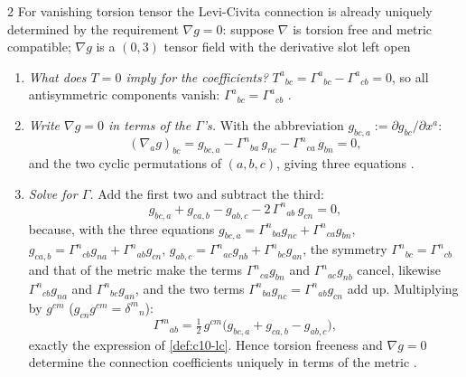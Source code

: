 \begin{paracol}{2}
For vanishing torsion tensor the Levi-Civita connection is already uniquely determined by the requirement $\nabla g=0$: suppose $\nabla$ is torsion free and metric compatible; $\nabla g$ is a $(0,3)$ tensor field with the derivative slot left open 
\begin{enumerate}
  \item \emph{What does $T=0$ imply for the coefficients?} $T^a{}_{bc}=\Gamma^a{}_{bc}-\Gamma^a{}_{cb}=0$, so all antisymmetric components vanish: $\Gamma^a{}_{bc}=\Gamma^a{}_{cb}$ .
  \item \emph{Write $\nabla g=0$ in terms of the $\Gamma$'s.} With the abbreviation $g_{bc,a}:=\partial g_{bc}/\partial x^a$:
        \[
          (\nabla_ag)_{bc}=g_{bc,a}-\Gamma^n{}_{ba}\,g_{nc}-\Gamma^n{}_{ca}\,g_{bn}=0,
        \]
        and the two cyclic permutations of $(a,b,c)$, giving three equations .
  \item \emph{Solve for $\Gamma$.} Add the first two and subtract the third:
        \[
          g_{bc,a}+g_{ca,b}-g_{ab,c}-2\,\Gamma^n{}_{ab}\,g_{cn}=0,
        \]
        because, with the three equations $g_{bc,a}=\Gamma^n{}_{ba}g_{nc}+\Gamma^n{}_{ca}g_{bn}$, $g_{ca,b}=\Gamma^n{}_{cb}g_{na}+\Gamma^n{}_{ab}g_{cn}$, $g_{ab,c}=\Gamma^n{}_{ac}g_{nb}+\Gamma^n{}_{bc}g_{an}$, the symmetry $\Gamma^n{}_{bc}=\Gamma^n{}_{cb}$ and that of the metric make the terms $\Gamma^n{}_{ca}g_{bn}$ and $\Gamma^n{}_{ac}g_{nb}$ cancel, likewise $\Gamma^n{}_{cb}g_{na}$ and $\Gamma^n{}_{bc}g_{an}$, and the two terms $\Gamma^n{}_{ba}g_{nc}=\Gamma^n{}_{ab}g_{cn}$ add up. Multiplying by $g^{cm}$ ($g_{cn}g^{cm}=\delta^m{}_n$):
        \[
          \Gamma^m{}_{ab}=\tfrac12\,g^{cm}\bigl(g_{bc,a}+g_{ca,b}-g_{ab,c}\bigr),
        \]
        exactly the expression of \cref{def:c10-lc}. Hence torsion freeness and $\nabla g=0$ determine the connection coefficients uniquely in terms of the metric .
\end{enumerate}


\end{paracol}
